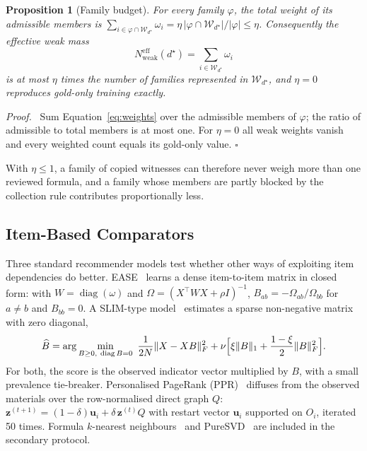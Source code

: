 \documentclass[applsci,article,submit,oneauthor]{Definitions/mdpi}
\newcommand{\fmly}{\varphi}
\newtheorem{xprop}{Proposition}
\newenvironment{xproof}{\par\noindent\textit{Proof.}\ }{\hfill$\square$\par\medskip}
\begin{document}
\begin{xprop}[Family budget]
\label{prop:budget}
For every family $\fmly$, the total weight of its admissible members is $\sum_{i\in\fmly\cap\mathcal W_{d^\star}}\omega_i=\eta\,|\fmly\cap\mathcal W_{d^\star}|/|\fmly|\le\eta$. Consequently the effective weak mass
\begin{equation}
N^{\mathrm{eff}}_{\mathrm{weak}}(d^\star)=\sum_{i\in\mathcal W_{d^\star}}\omega_i
\label{eq:effmass}
\end{equation}
is at most $\eta$ times the number of families represented in $\mathcal W_{d^\star}$, and $\eta=0$ reproduces gold-only training exactly.
\end{xprop}
\begin{xproof}
Sum Equation~\eqref{eq:weights} over the admissible members of $\fmly$; the ratio of admissible to total members is at most one. For $\eta=0$ all weak weights vanish and every weighted count equals its gold-only value.
\end{xproof}

With $\eta\le1$, a family of copied witnesses can therefore never weigh more than one reviewed formula, and a family whose members are partly blocked by the collection rule contributes proportionally less.

\subsection{Item-Based Comparators}
\label{sec:items}

Three standard recommender models test whether other ways of exploiting item dependencies do better. EASE~\cite{steck2019} learns a dense item-to-item matrix in closed form: with $W=\operatorname{diag}(\omega)$ and $\Omega=(X^\top WX+\rho I)^{-1}$, $B_{ab}=-\Omega_{ab}/\Omega_{bb}$ for $a\ne b$ and $B_{bb}=0$. A SLIM-type model~\cite{ning2011} estimates a sparse non-negative matrix with zero diagonal,
\begin{equation}
\widehat B=\arg\min_{B\ge0,\ \operatorname{diag}B=0}\ \frac1{2N}\lVert X-XB\rVert_F^2+\nu\Bigl[\xi\lVert B\rVert_1+\frac{1-\xi}{2}\lVert B\rVert_F^2\Bigr].
\label{eq:slim}
\end{equation}
For both, the score is the observed indicator vector multiplied by $B$, with a small prevalence tie-breaker. Personalised PageRank (PPR)~\cite{page1999} diffuses from the observed materials over the row-normalised direct graph $Q$: $\bm z^{(t+1)}=(1-\delta)\bm u_i+\delta\,\bm z^{(t)}Q$ with restart vector $\bm u_i$ supported on $O_i$, iterated 50 times. Formula $k$-nearest neighbours~\cite{cover1967} and PureSVD~\cite{cremonesi2010} are included in the secondary protocol.
\end{document}
